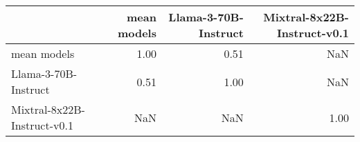 \begin{tabular}{lrrr}
\toprule
 & mean models & Llama-3-70B-Instruct & Mixtral-8x22B-Instruct-v0.1 \\
\midrule
mean models & 1.00 & 0.51 & NaN \\
Llama-3-70B-Instruct & 0.51 & 1.00 & NaN \\
Mixtral-8x22B-Instruct-v0.1 & NaN & NaN & 1.00 \\
\bottomrule
\end{tabular}
